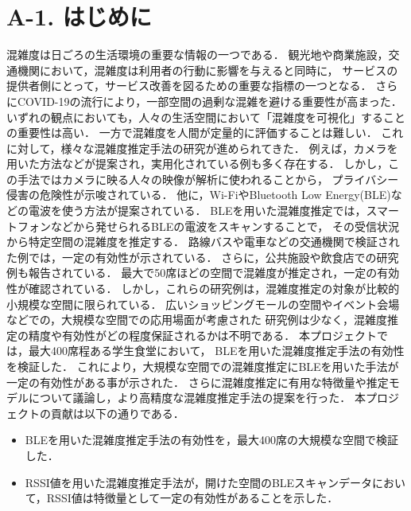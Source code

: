 \section*{A-1. はじめに}
混雑度は日ごろの生活環境の重要な情報の一つである．
観光地や商業施設，交通機関において，混雑度は利用者の行動に影響を与えると同時に，
サービスの提供者側にとって，サービス改善を図るための重要な指標の一つとなる．
さらにCOVID-19の流行により，一部空間の過剰な混雑を避ける重要性が高まった．
いずれの観点においても，人々の生活空間において「混雑度を可視化」することの重要性は高い．
一方で混雑度を人間が定量的に評価することは難しい．
これに対して，様々な混雑度推定手法の研究が進められてきた．
例えば，カメラを用いた方法などが提案され，実用化されている例も多く存在する．
しかし，この手法ではカメラに映る人々の映像が解析に使われることから，
プライバシー侵害の危険性が示唆されている\cite{senkou_privacy}．
他に，Wi-FiやBluetooth Low Energy(BLE)などの電波を使う方法が提案されている．
BLEを用いた混雑度推定では，スマートフォンなどから発せられるBLEの電波をスキャンすることで，
その受信状況から特定空間の混雑度を推定する．
路線バスや電車などの交通機関で検証された例では，一定の有効性が示されている．
さらに，公共施設や飲食店での研究例も報告されている\cite{senkou}．
最大で50席ほどの空間で混雑度が推定され，一定の有効性が確認されている．
しかし，これらの研究例は，混雑度推定の対象が比較的小規模な空間に限られている．
広いショッピングモールの空間やイベント会場などでの，大規模な空間での応用場面が考慮された
研究例は少なく，混雑度推定の精度や有効性がどの程度保証されるかは不明である．
本プロジェクトでは，最大400席程ある学生食堂において，
BLEを用いた混雑度推定手法の有効性を検証した．
これにより，大規模な空間での混雑度推定にBLEを用いた手法が一定の有効性がある事が示された．
さらに混雑度推定に有用な特徴量や推定モデルについて議論し，より高精度な混雑度推定手法の提案を行った．
本プロジェクトの貢献は以下の通りである．
\begin{itemize}
  \item BLEを用いた混雑度推定手法の有効性を，最大400席の大規模な空間で検証した．
  \item RSSI値を用いた混雑度推定手法が，開けた空間のBLEスキャンデータにおいて，RSSI値は特徴量として一定の有効性があることを示した．
\end{itemize}